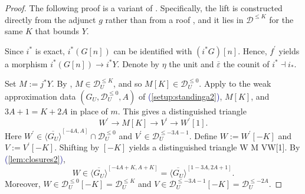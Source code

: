 \documentclass[11pt]{amsart}
\def\eqref#1{\textcolor{darkblue}{(\ref{#1})}}
\let\oldequation\equation
\let\oldendequation\endequation
\renewenvironment{equation}{\linenomathNonumbers\oldequation}{\oldendequation\endlinenomath}
\theoremstyle{plain}
\theoremstyle{definition}
\numberwithin{equation}{section}
\numberwithin{theorem}{section}
\begin{document}
\begin{proof}
    The following proof is a variant of \cite[Lemma 5.3]{Burke/Neeman/Pauwels:2023}.
    Specifically, the lift is constructed directly from the adjunct $g$ rather than from a roof \cite[Lemma 5.2]{Burke/Neeman/Pauwels:2023}, and it lies in $\mathcal{D}^{\leq K}$ for the same $K$ that bounds $Y$.

    Since $i^\ast$ is exact, $i^\ast(G[n])$ can be identified with $(i^\ast G)[n]$.
    Hence, $f^\prime$ yields a morphism $i^\ast(G[n])\to i^\ast Y$.
    Denote by $\eta$ the unit and $\overline{\varepsilon}$ the counit of $i^\ast\dashv i_\ast$.

    Set $M := j^\ast Y$.
    By , $M\in \mathcal{D}_U^{\leq K}$, and so $M[K]\in \mathcal{D}_U^{\leq 0}$.
    Apply  to the weak approximation data $(G_U,\mathcal{D}_U^{\leq 0},A)$ of \eqref{setup:standinga2}, $M[K]$, and $3A+1 = K+2A$ in place of $m$.
    This gives a distinguished triangle
    \begin{displaymath}
        W^\prime\to M[K]\to V^\prime\to W^\prime[1].
    \end{displaymath}
    Here $W^\prime\in \overline{\langle G_U\rangle}^{[-4A,A]}\cap \mathcal{D}_U^{\leq 0}$ and $V^\prime\in \mathcal{D}_U^{\leq -3A-1}$.
    Define $W := W^\prime[-K]$ and $V := V^\prime[-K]$.
    Shifting by $[-K]$ yields a distinguished triangle
    \begin{equation}
        \label{eq:onecell_wc}
        W M V\to W[1].
    \end{equation}
    By \eqref{lem:closures2},
    \begin{displaymath}
        W\in \overline{\langle G_U\rangle}^{[-4A+K,A+K]} = \overline{\langle G_U\rangle}^{[1-3A,2A+1]}.
    \end{displaymath}
    Moreover, $W\in \mathcal{D}_U^{\leq 0}[-K] = \mathcal{D}_U^{\leq K}$ and $V\in \mathcal{D}_U^{\leq -3A-1}[-K] = \mathcal{D}_U^{\leq -2A}$.


\end{proof}
\end{document}
